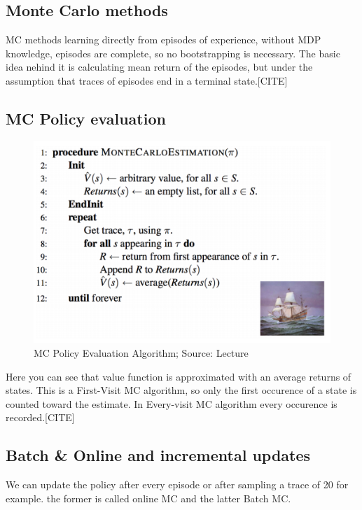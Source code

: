 \subsection{Monte Carlo methods}

MC methods learning directly from episodes of experience,
without MDP knowledge, episodes are complete, so no bootstrapping is necessary. The basic idea nehind it is calculating mean return of the episodes, but under the assumption that traces of episodes end in a terminal state.[CITE]

\subsection{MC Policy evaluation}

\begin{figure}[h!]
  \centering
  \includegraphics[scale=0.5]{figures/mc_policy_evaluation.PNG}
  \caption{MC Policy Evaluation Algorithm; Source: Lecture}
  \label{fig:via}
\end{figure}

Here you can see that value function is approximated with an average returns of states. This is a First-Visit MC algorithm, so only the first occurence of a state is counted toward the estimate. In Every-visit MC algorithm every occurence is recorded.[CITE]



\subsection{Batch \& Online and incremental updates}
We can update the policy after every episode or after
sampling a trace of 20 for example. the former is called online MC and the latter Batch MC.

